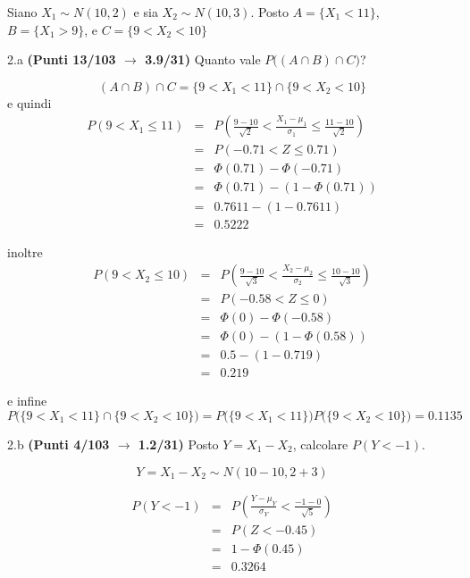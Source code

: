 \documentclass[
  11pt,
]{book}
\theoremstyle{mytheoremstyle}
\theoremstyle{mydefstyle}
\newenvironment{sol}
  {
  \begin{tcolorbox}[enhanced,breakable,arc=0.1mm,boxrule=1pt,colback=white,colframe=iblue,
  title=\bf \fontfamily{lmss}\selectfont \hspace{.5 cm} Soluzione,drop fuzzy shadow]

}{
\end{tcolorbox}
  }
\begin{document}
Siano \(X_1\sim N(10,2)\) e sia \(X_2\sim N(10,3)\). Posto \(A=\{X_1<11\}\), \(B=\{X_1>9\}\), e \(C=\{9<X_2<10\}\)

2.a \textbf{(Punti 13/103 \(\rightarrow\) 3.9/31)} Quanto vale \(P\Big((A\cap B)\cap C\Big)\)?

\begin{sol}
\[
(A\cap B)\cap C = \{9<X_1<11\}\cap\{9<X_2<10\}
\]
e quindi
\begin{eqnarray*}
   P( 9 < X_1 \leq  11 ) &=& P\left( \frac { 9  -  10 }{\sqrt{ 2 }} < \frac { X_1  -  \mu_1 }{ \sigma_1 } \leq \frac { 11  -  10 }{\sqrt{ 2 }}\right)  \\
              &=& P\left(  -0.71  < Z \leq  0.71 \right) \\
              &=& \Phi( 0.71 )-\Phi( -0.71 )\\
              &=&  \Phi( 0.71 )-(1-\Phi( 0.71 )) \\ &=&  0.7611 -(1- 0.7611 ) \\ 
              &=&  0.5222 
   \end{eqnarray*}

inoltre
\begin{eqnarray*}
   P( 9 < X_2 \leq  10 ) &=& P\left( \frac { 9  -  10 }{\sqrt{ 3 }} < \frac { X_2  -  \mu_2 }{ \sigma_2 } \leq \frac { 10  -  10 }{\sqrt{ 3 }}\right)  \\
              &=& P\left(  -0.58  < Z \leq  0 \right) \\
              &=& \Phi( 0 )-\Phi( -0.58 )\\
              &=&  \Phi( 0 )-(1-\Phi( 0.58 )) \\ &=&  0.5 -(1- 0.719 ) \\ 
              &=&  0.219 
   \end{eqnarray*}

e infine
\[
P\Big(\{9<X_1<11\}\cap\{9<X_2<10\}\Big)=P\Big(\{9<X_1<11\}\Big)P\Big(\{9<X_2<10\}\Big)=
0.1135
\]

\end{sol}

2.b \textbf{(Punti 4/103 \(\rightarrow\) 1.2/31)} Posto \(Y=X_1-X_2\), calcolare \(P(Y<-1)\).

\begin{sol}
\[Y=X_1-X_2\sim N(10-10,2+3)\]

\begin{eqnarray*}
      P( Y   <   -1 ) 
        &=& P\left(  \frac { Y  -  \mu_Y }{ \sigma_Y }  <  \frac { -1  -  0 }{\sqrt{ 5 }} \right)  \\
                 &=& P\left(  Z   <   -0.45 \right) \\    
                 &=&  1-\Phi( 0.45 ) \\ &=&  0.3264 
      \end{eqnarray*}

\end{sol}
\end{document}
